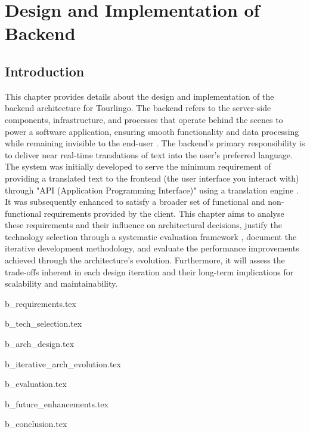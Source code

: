 \section{Design and Implementation of Backend}\label{sec:backend}

\subsection{Introduction}
This chapter provides details about the design and implementation of the backend architecture for Tourlingo. The backend refers to the server-side components, infrastructure, and processes that operate behind the scenes to power a software application, ensuring smooth functionality and data processing while remaining invisible to the end-user \cite{Backend-def}. The backend's primary responsibility is to deliver near real-time translations of text into the user's preferred language. The system was initially developed to serve the minimum requirement of providing a translated text to the frontend (the user interface you interact with) through "API (Application Programming Interface)" \cite{what-is-an-api} using a translation engine \cite{machine-translation}\cite{libretranslate}. It was subsequently enhanced to satisfy a broader set of functional and non-functional requirements provided by the client. This chapter aims to analyse these requirements and their influence on architectural decisions\cite{parmar2011architectural}, justify the technology selection through a systematic evaluation framework \cite{mcda}\cite{decision-matrix-software-development}, document the iterative development methodology, and evaluate the performance improvements achieved through the architecture's evolution. Furthermore, it will assess the trade-offs inherent in each design iteration and their long-term implications for scalability and maintainability. 

{b_requirements.tex}

{b_tech_selection.tex}

{b_arch_design.tex}

{b_iterative_arch_evolution.tex}

{b_evaluation.tex}

{b_future_enhancements.tex}

{b_conclusion.tex}